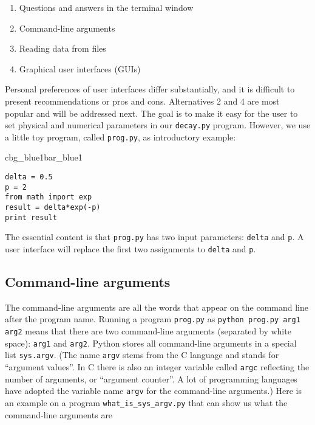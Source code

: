 \documentclass[graybox,sectrefs,envcountresetchap,open=right,final]{svmonodo}
\newenvironment{_pro_tight}[2]{
   \def\FrameCommand{\color{#2}\vrule width 1mm\normalcolor\colorbox{#1}}
   \FrameRule0.6pt\MakeFramed {\advance\hsize-2mm\FrameRestore}\vskip3mm}
   {\vskip0mm\endMakeFramed}
\newenvironment{pro}[2]{
\bgroup\rmfamily
\fboxsep=0mm\relax
\begin{_pro_tight}{#1}{#2}
\list{}{\parsep=-2mm\parskip=0mm\topsep=0pt\leftmargin=2mm
\rightmargin=2\leftmargin\leftmargin=4pt\relax}
\item\relax}
{\endlist\end{_pro_tight}\egroup}
\begin{document}
\begin{enumerate}
\item Questions and answers in the terminal window

\item Command-line arguments

\item Reading data from files

\item Graphical user interfaces (GUIs)
\end{enumerate}

\noindent
Personal preferences of user interfaces differ substantially, and it is
difficult to present recommendations or pros and cons.
Alternatives 2 and 4 are most popular and will be addressed next.
The goal is to make it easy for the user to
set physical and numerical parameters in
our \texttt{decay.py} program. However, we use  a little toy program, called
\texttt{prog.py}, as introductory
example:

\begin{pro}{cbg_blue1}{bar_blue1}\begin{Verbatim}[numbers=none,fontsize=\fontsize{9pt}{9pt},baselinestretch=0.95,xleftmargin=2mm]
delta = 0.5
p = 2
from math import exp
result = delta*exp(-p)
print result
\end{Verbatim}
\end{pro}
\noindent
The essential content is that \texttt{prog.py} has two input parameters: \texttt{delta}
and \texttt{p}. A user interface will replace the first two assignments to
\texttt{delta} and \texttt{p}.

\subsection{Command-line arguments}

The command-line arguments are all the words that appear on the
command line after the program name. Running a program \texttt{prog.py}
as \texttt{python prog.py arg1 arg2} means that there are two command-line arguments
(separated by white space): \texttt{arg1} and \texttt{arg2}.
Python stores all command-line arguments in
a special list \texttt{sys.argv}. (The name \texttt{argv} stems from the C language and
stands for ``argument values''. In C there is also an integer variable
called \texttt{argc} reflecting the number of arguments, or ``argument counter''.
A lot of programming languages have adopted the variable name \texttt{argv} for
the command-line arguments.)
Here is an example on a
program \Verb!what_is_sys_argv.py! that can show us what the command-line arguments
are
\end{document}
